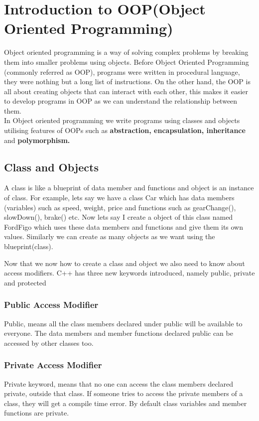 \documentclass[11pt, a4paper]{article}
\begin{document}
\newpage
\section{Introduction to OOP(Object Oriented Programming)}
Object oriented programming is a way of solving complex problems by breaking
them into smaller problems using objects. Before Object Oriented Programming
(commonly referred as OOP), programs were written in procedural language,
they were nothing but a long list of instructions. On the other hand, the OOP
is all about creating objects that can interact with each other, this makes it
easier to develop programs in OOP as we can understand the relationship between them.\\
In Object oriented programming we write programs using classes and objects utilising
features of OOPs such as \textbf{abstraction, encapsulation, inheritance} and
\textbf{polymorphism.}

\subsection{Class and Objects}
A class is like a blueprint of data member and functions and object is an instance
of class. For example, lets say we have a class Car which has data members (variables)
such as speed, weight, price and functions such as gearChange(), slowDown(), brake() etc.
Now lets say I create a object of this class named FordFigo which uses these data members
and functions and give them its own values. Similarly we can create as many objects as we
want using the blueprint(class).

Now that we now how to create a class and object we also need to know about access modifiers.
C++ has three new keywords introduced, namely public, private and protected

\subsubsection{Public Access Modifier}
Public, means all the class members declared under public will be available to everyone. The data members and member functions declared public can be accessed by other classes too.


\subsubsection{Private Access Modifier}
Private keyword, means that no one can access the class members declared private,
outside that class. If someone tries to access the private members of a class, they
will get a compile time error. By default class variables and member functions are private.

\end{document}
